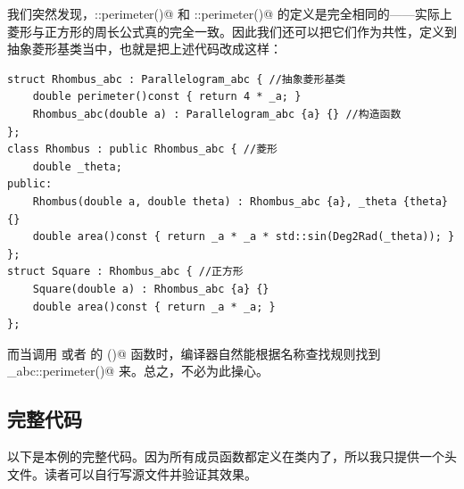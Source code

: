 我们突然发现，\lstinline@Rhombus::perimeter()@ 和 \lstinline@Square::perimeter()@ 的定义是完全相同的——实际上菱形与正方形的周长公式真的完全一致。因此我们还可以把它们作为共性，定义到抽象菱形基类当中，也就是把上述代码改成这样：
\begin{lstlisting}
struct Rhombus_abc : Parallelogram_abc { //抽象菱形基类
    double perimeter()const { return 4 * _a; }
    Rhombus_abc(double a) : Parallelogram_abc {a} {} //构造函数
};
class Rhombus : public Rhombus_abc { //菱形
    double _theta;
public:
    Rhombus(double a, double theta) : Rhombus_abc {a}, _theta {theta} {}
    double area()const { return _a * _a * std::sin(Deg2Rad(_theta)); }
};
struct Square : Rhombus_abc { //正方形
    Square(double a) : Rhombus_abc {a} {}
    double area()const { return _a * _a; }
};
\end{lstlisting}
而当调用 \lstinline@Rhombus@ 或者 \lstinline@square@ 的 \lstinline@perimeter()@ 函数时，编译器自然能根据名称查找规则找到 \lstinline@Rhombus_abc::perimeter()@ 来。总之，不必为此操心。\par
\subsection*{完整代码}
以下是本例的完整代码。因为所有成员函数都定义在类内了，所以我只提供一个头文件。读者可以自行写源文件并验证其效果。
\par
